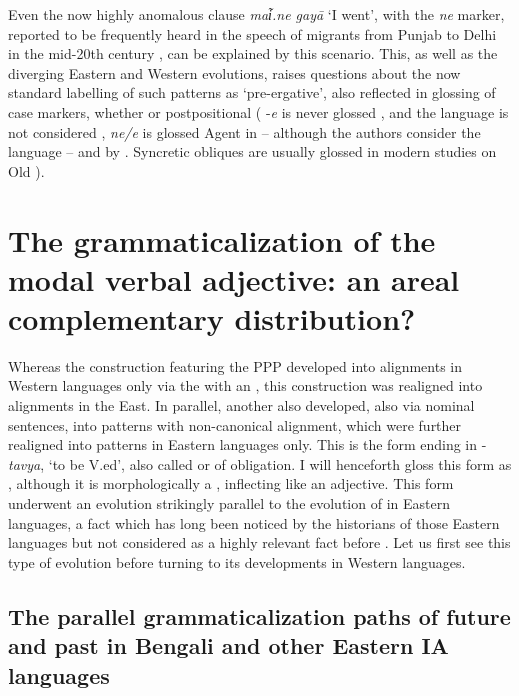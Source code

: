\documentclass[output=paper]{langsci/langscibook}
\begin{document}
Even the now highly anomalous clause \textit{mai͂.ne gayā} ‘I went’, with the \textit{ne} mark\-er, reported to be frequently heard in the speech of migrants from Punjab to Delhi in the mid-20th century \citep[71]{Chatterji1986}, can be explained by this scenario. This, as well as the diverging Eastern and Western evolutions, raises questions about the now standard labelling of such patterns as ‘pre-er\-ga\-tive’, also reflected in glossing of case markers, whether  or postpositional ( -\textit{e} is never glossed , and the language is not considered ,  \textit{ne/e} is glossed Agent in \citet{Cardona2003} – although the authors consider the language  – and  by \citet{Mistry1997}. Syncretic obliques are usually glossed  in modern studies on Old ). 

\section{The grammaticalization of the modal verbal adjective: an areal complementary distribution?}\label{sec:montaut:3}

Whereas the construction featuring the PPP developed into  alignments in Western languages only via the  with an , this construction was realigned into  alignments in the East. In parallel, another  also developed, also via nominal sentences, into patterns with non-canonical alignment, which were further realigned into  patterns in Eastern languages only. This  is the form ending in -\textit{tavya}, ‘to be V.ed’, also called  or  of obligation. I will henceforth gloss this form as , although it is morphologically a , inflecting like an adjective. This form underwent an evolution strikingly parallel to the evolution of  in Eastern languages, a fact which has long been noticed by the historians of those Eastern languages but not considered as a highly relevant fact before \citet{Montaut1996,Montaut2007,MontautInPress}. Let us first see this type of evolution before turning to its developments in Western languages.

\subsection{The parallel grammaticalization paths of future and past in Bengali and other Eastern IA languages}\label{sec:montaut:3.1}
\end{document}
